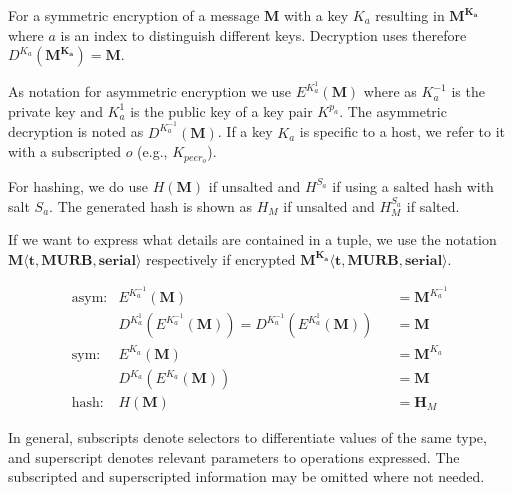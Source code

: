\documentclass[10pt,journal,compsoc,twocolumn,twoside]{IEEEtran}
\begin{document}
For a symmetric encryption of a message $\mathbf{M}$ with a key $K_a$ resulting in $\mathbf{M^{K_a}}$ where $a$ is an index to distinguish different keys. Decryption uses therefore $D^{K_a}(\mathbf{M^{K_a}})=\mathbf{M}$.

As notation for asymmetric encryption we use $E^{K^{1}_a}(\mathbf{M})$ where as $K^{-1}_a$ is the private key and $K^{1}_a$ is the public key of a key pair $K^{p_a}$. The asymmetric decryption is noted as $D^{K^{-1}_a}(\mathbf{M})$. If a key $K_a$ is specific to a host, we refer to it with a subscripted $o$ (e.g., $K_{peer_o}$).

For hashing, we do use $H(\mathbf{M})$ if unsalted and $H^{S_a}$ if using a salted hash with salt $S_a$. The generated hash is shown as $H_M$ if unsalted and $H^{S_a}_M$ if salted.

If we want to express what details are contained in a tuple, we use the notation $\mathbf{M\langle t,MURB,serial\rangle }$ respectively if encrypted $\mathbf{M^{K_{a}}\langle t,MURB,serial\rangle}$.

\begin{align*}
\text{asym:}         & E^{K^{-1}_a}\left(\mathbf{M}\right)                            && =\mathbf{M}^{K^{-1}_a}\\
                           & D^{K^{1}_a}\left(E^{K^{-1}_a}\left(\mathbf{M}\right)\right) = D^{K^{-1}_a}\left(E^{K^{1}_a}\left(\mathbf{M}\right)\right)    && =\mathbf{M}\\
\text{sym:}          & E^{K_a}\left(\mathbf{M}\right)                                 && =\mathbf{M}^{K_a}\\
& D^{K_a}\left(E^{K_a}\left(\mathbf{M}\right)\right)          && =\mathbf{M}\\
\text{hash:}& H\left(\mathbf{M}\right)                                       && =\mathbf{H}_M
\end{align*}

In general, subscripts denote selectors to differentiate values of the same type, and superscript denotes relevant parameters to operations expressed. The subscripted and superscripted information may be omitted where not needed.
\end{document}
